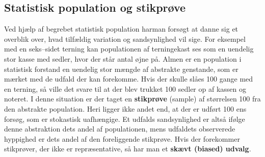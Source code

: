 \documentclass[11pt]{article}
\begin{document}
\subsection{Statistisk population og stikprøve}
Ved hjælp af begrebet statistisk population harman forsøgt at danne sig et overblik over, hvad tilfældig variation og sandsynlighed vil sige. For eksempel med en seks--sidet terning kan populationen af terningekast ses som en uendelig stor kasse med sedler, hvor der står antal øjne på. Almen er en population i statistisk forstand en uendelig stor mængde af abstrakte genstande, som er mærket med de udfald der kan forekomme. Hvis der skulle slåes 100 gange med en terning, så ville det svare til at der blev trukket 100 sedler op af kassen og noteret. I denne situation er der taget en \textbf{stikprøve} (sample) af størrelsen 100 fra den abstrakte population. Heri ligger ikke andet end, at der er udført 100 ens forsøg, som er stokastisk uafhængige. Et udfalds sandsynlighed er altså ifølge denne abstraktion dets andel af populationen, mens udfaldets observerede hyppighed er dets andel af den foreliggende stikprøve. Hvis der forekommer stikprøver, der ikke er repræsentative, så har man et \textbf{skævt (biased) udvalg}.
\end{document}
